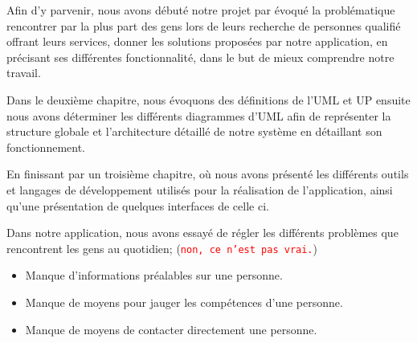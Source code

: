\documentclass[french]{report}
\newcommand\rmq[1]{\textcolor{red}{\tt #1}}
\begin{document}
Afin d'y parvenir, nous avons débuté notre projet par évoqué la problématique
rencontrer par la plus part des gens lors de leurs recherche de personnes
qualifié offrant leurs services, donner les solutions proposées par notre
application, en précisant ses différentes fonctionnalité, dans le but de mieux
comprendre notre travail. 

Dans le deuxième chapitre, nous évoquons des définitions de l'UML et UP ensuite
nous avons déterminer les différents diagrammes d'UML afin de représenter la
structure globale et l'architecture détaillé de notre système en détaillant son
fonctionnement.

En finissant par un troisième chapitre, où nous avons présenté les différents
outils et langages de développement utilisés pour la réalisation de
l'application, ainsi qu'une présentation de quelques interfaces de celle ci.
    
Dans notre application, nous avons essayé de régler les différents problèmes
que rencontrent les gens au quotidien; (\rmq{non, ce n'est pas vrai.})

\begin{itemize}
    \item Manque d'informations préalables sur une personne.
    \item Manque de moyens pour jauger les compétences d'une personne.
    \item Manque de moyens de contacter directement une personne.
\end{itemize}

\printbibliography
\end{document}
